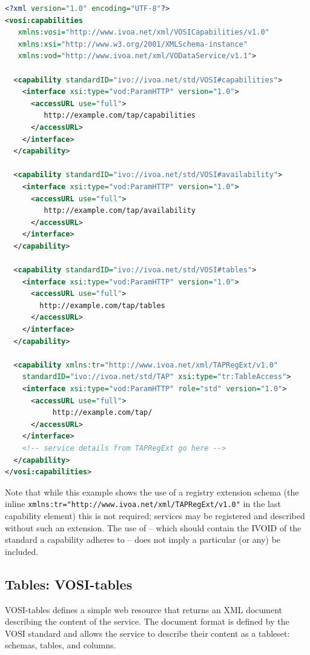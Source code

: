 \documentclass[11pt,letter]{ivoa}
\begin{document}
\begin{lstlisting}[language=XML,basicstyle=\footnotesize]
<?xml version="1.0" encoding="UTF-8"?>
<vosi:capabilities
   xmlns:vosi="http://www.ivoa.net/xml/VOSICapabilities/v1.0"
   xmlns:xsi="http://www.w3.org/2001/XMLSchema-instance"
   xmlns:vod="http://www.ivoa.net/xml/VODataService/v1.1">

  <capability standardID="ivo://ivoa.net/std/VOSI#capabilities">
    <interface xsi:type="vod:ParamHTTP" version="1.0">
      <accessURL use="full">
         http://example.com/tap/capabilities
      </accessURL>
    </interface>
  </capability>

  <capability standardID="ivo://ivoa.net/std/VOSI#availability">
    <interface xsi:type="vod:ParamHTTP" version="1.0">
      <accessURL use="full">
         http://example.com/tap/availability
      </accessURL>
    </interface>
  </capability>

  <capability standardID="ivo://ivoa.net/std/VOSI#tables">
    <interface xsi:type="vod:ParamHTTP" version="1.0">
      <accessURL use="full">
        http://example.com/tap/tables
      </accessURL>
    </interface>
  </capability>

  <capability xmlns:tr="http://www.ivoa.net/xml/TAPRegExt/v1.0"
    standardID="ivo://ivoa.net/std/TAP" xsi:type="tr:TableAccess">
    <interface xsi:type="vod:ParamHTTP" role="std" version="1.0">
      <accessURL use="full">
           http://example.com/tap/
      </accessURL>
    </interface>
    <!-- service details from TAPRegExt go here -->
  </capability>
</vosi:capabilities>
\end{lstlisting}

Note that while this example shows the use of a registry extension schema (the 
inline \verb|xmlns:tr="http://www.ivoa.net/xml/TAPRegExt/v1.0"| in the last capability 
element) this is not required; services may be registered and described without 
such an extension. The use of  -- which should contain the
IVOID of 
the standard a capability adheres to -- does not imply a particular (or any) 
 be included.

\subsection{Tables: VOSI-tables}
\label{sec:vosi-tables}
VOSI-tables \citep{2017ivoa.spec.0524G} defines a simple web resource that returns an 
XML document 
describing the content of the service. The document format is defined by the 
VOSI \citep{2017ivoa.spec.0524G} standard and allows the service to 
describe their content 
as a tableset: schemas, tables, and columns.
\end{document}
